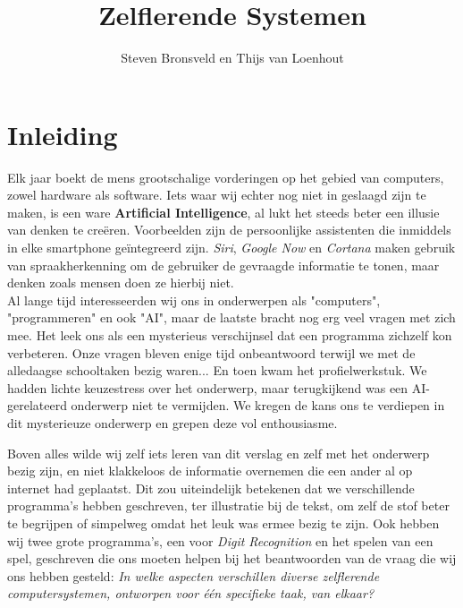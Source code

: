\documentclass[a4paper,titlepage]{article}
\title{Zelflerende Systemen}
\author{Steven Bronsveld en Thijs van Loenhout}
\begin{document}
\begin{titlepage}

\maketitle
\end{titlepage}

\renewcommand{\contentsname}{Inhoud}

\newpage
\tableofcontents



\newpage
\section{Inleiding}
Elk jaar boekt de mens grootschalige vorderingen op het gebied van computers, zowel hardware als software. Iets waar wij echter nog niet in geslaagd zijn te maken, is een ware \textbf{ Artificial Intelligence}, al lukt het steeds beter een illusie van denken te cre\"eren. Voorbeelden zijn de persoonlijke assistenten die inmiddels in elke smartphone ge\"integreerd zijn. \textit{Siri}, \textit{Google Now} en \textit{Cortana} maken gebruik van spraakherkenning om de gebruiker de gevraagde informatie te tonen, maar denken zoals mensen doen ze hierbij niet. \\

Al lange tijd interesseerden wij ons in onderwerpen als "computers", "programmeren" en ook "AI", maar de laatste bracht nog erg veel vragen met zich mee. Het leek ons als een mysterieus verschijnsel dat een programma zichzelf kon verbeteren. Onze vragen bleven enige tijd onbeantwoord terwijl we met de alledaagse schooltaken bezig waren... En toen kwam het profielwerkstuk. We hadden lichte keuzestress over het onderwerp, maar terugkijkend was een AI-gerelateerd onderwerp niet te vermijden. We kregen de kans ons te verdiepen in dit mysterieuze onderwerp en grepen deze vol enthousiasme.

Boven alles wilde wij zelf iets leren van dit verslag en zelf met het onderwerp bezig zijn, en niet klakkeloos de informatie overnemen die een ander al op internet had geplaatst. Dit zou uiteindelijk betekenen dat we verschillende programma's hebben geschreven, ter illustratie bij de tekst, om zelf de stof beter te begrijpen of simpelweg omdat het leuk was ermee bezig te zijn. Ook hebben wij twee grote programma's, een voor \textit{Digit Recognition} en het spelen van een spel, geschreven die ons moeten helpen bij het beantwoorden van de vraag die wij ons hebben gesteld: \textit{In welke aspecten verschillen diverse zelflerende computersystemen, ontworpen voor \'e\'en specifieke taak, van elkaar?}
\end{document}
